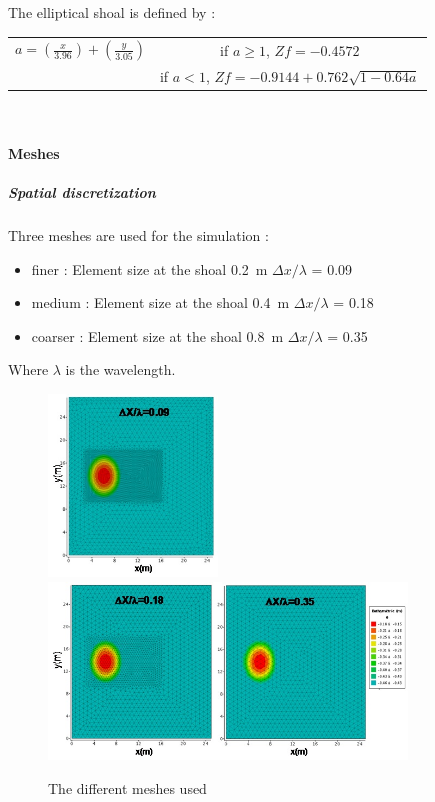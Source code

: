 \vspace{1cm}

The elliptical shoal is defined by :\\
\begin{center}

\begin{tabular}{c|c}
$a = (\frac{x}{3.96})+(\frac{y}{3.05})$ & if $a \geq 1$, $Zf = -0.4572$\\
 & if $a < 1$, $Zf = -0.9144+0.762 \sqrt{1-0.64a}$
\end{tabular}\\
\end{center}
\paragraph{Meshes}
\subparagraph{Spatial discretization}
Three meshes are used for the simulation :
\begin{itemize}
\item finer : Element size at the shoal 0.2~m \quad $\Delta x/\lambda$ = 0.09
\item medium : Element size at the shoal 0.4~m \quad $\Delta x/\lambda$ = 0.18
\item coarser : Element size at the shoal 0.8~m \quad $\Delta x/\lambda$ = 0.35
\end{itemize}

Where $\lambda$ is the wavelength.
\begin{figure}[h!]
  \centering
    \includegraphics[width=0.4\textwidth]{mesh009.jpg}\\
    \includegraphics[width=0.85\textwidth]{meshes018035.jpg}
      \caption{The different meshes used}
\label{meshshoal}
\end{figure}

